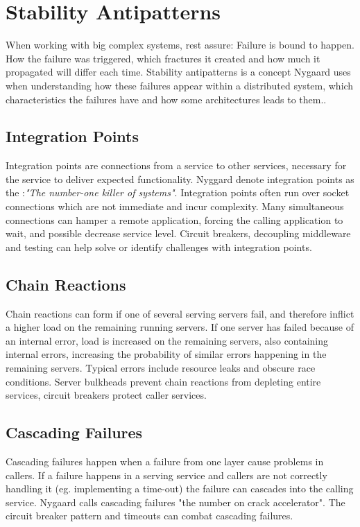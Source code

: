 

\section{Stability Antipatterns}
When working with big complex systems, rest assure: Failure is bound to happen. How the failure was triggered, which fractures it created and how much it propagated will differ each time. Stability antipatterns is a concept Nygaard uses when understanding how these failures appear within a distributed system, which characteristics the failures have and how some architectures leads to them.\cite[p. 31]{nygard2007release}.

\subsection{Integration Points}
Integration points are connections from a service to other services, necessary for the service to deliver expected functionality. Nyggard denote integration points as the :\textit{"The number-one killer of systems"}\cite[p. 33]{nygard2007release}. Integration points often run over socket connections which are not immediate and incur complexity. Many simultaneous connections can hamper a remote application, forcing the calling application to wait, and possible decrease service level.
Circuit breakers, decoupling middleware and testing can help solve or identify challenges with integration points.

\subsection{Chain Reactions}
Chain reactions can form if one of several serving servers fail, and therefore inflict a higher load on the remaining running servers. If one server has failed because of an internal error, load is increased on the remaining servers, also containing internal errors, increasing the probability of similar errors happening in the remaining servers. Typical errors include resource leaks and obscure race conditions.
Server bulkheads prevent chain reactions from depleting entire services, circuit breakers protect caller services.

\subsection{Cascading Failures}
Cascading failures happen when a failure from one layer cause problems in callers. If a failure happens in a serving service and callers are not correctly handling it (eg. implementing a time-out) the failure can cascades into the calling service. Nygaard calls cascading failures "the number on crack accelerator"\cite[p. 49]{nygard2007release}.
The circuit breaker pattern and timeouts can combat cascading failures.

